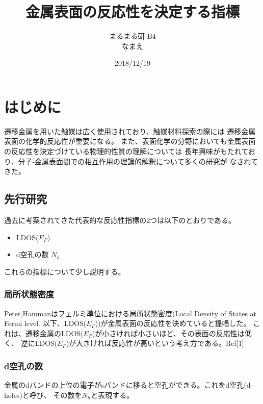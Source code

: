 \documentclass[12pt]{ltjsarticle}
\begin{document}
\begin{titlepage}
\title{金属表面の反応性を決定する指標}
\author{まるまる研 B4 \\ なまえ}
\date{2018/12/19}
\maketitle
\tableofcontents

\end{titlepage}

\section{はじめに}
遷移金属を用いた触媒は広く使用されており、触媒材料探索の際には
遷移金属表面の化学的反応性が重要になる。
また、表面化学の分野においても金属表面の反応性を決定づけている物理的性質の理解については
長年興味がもたれており、分子-金属表面間での相互作用の理論的解釈について多くの研究が
なされてきた。 \\

\subsection{先行研究}

過去に考案されてきた代表的な反応性指標の2つは以下のとおりである。

\begin{itemize}
 \item LDOS($E_F$)
 \item d空孔の数 $N_h$
\end{itemize}

これらの指標について少し説明する。

\subsubsection{局所状態密度}
Peter,Hammanはフェルミ準位における局所状態密度(Local Density of States at Fermi level.
以下、LDOS($E_F$))が金属表面の反応性を決めていると提唱した。
これは、遷移金属のLDOS($E_F$)が小さければ小さいほど、その表面の反応性は低く、
逆にLDOS($E_F$)が大きければ反応性が高いという考え方である。Ref[1]

\subsubsection{d空孔の数}
金属のdバンドの上位の電子がsバンドに移ると空孔ができる。これをd空孔(d-holes)と呼び、
その数を$N_h$と表現する。
\end{document}
